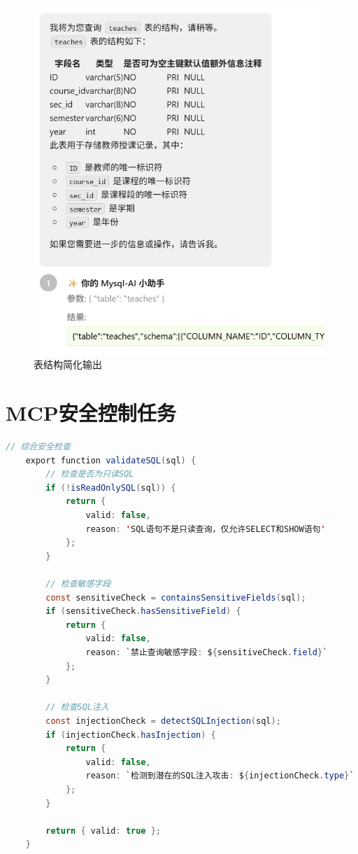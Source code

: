 \documentclass{article}
\begin{document}
	\begin{figure}[H]
		\centering
		\includegraphics[width=11cm]{./images/3.简化表格.jpg}
		\caption{表结构简化输出}
	\end{figure}
	
	\section{MCP安全控制任务}
	
	\begin{lstlisting}[language=java, title=MCP安全检查, tabsize=4]
	// 综合安全检查
	export function validateSQL(sql) {
		// 检查是否为只读SQL
		if (!isReadOnlySQL(sql)) {
			return {
				valid: false,
				reason: 'SQL语句不是只读查询，仅允许SELECT和SHOW语句'
			};
		}
		
		// 检查敏感字段
		const sensitiveCheck = containsSensitiveFields(sql);
		if (sensitiveCheck.hasSensitiveField) {
			return {
				valid: false,
				reason: `禁止查询敏感字段: ${sensitiveCheck.field}`
			};
		}
		
		// 检查SQL注入
		const injectionCheck = detectSQLInjection(sql);
		if (injectionCheck.hasInjection) {
			return {
				valid: false,
				reason: `检测到潜在的SQL注入攻击: ${injectionCheck.type}`
			};
		}
		
		return { valid: true };
	}
	\end{lstlisting}
	
\end{document}
